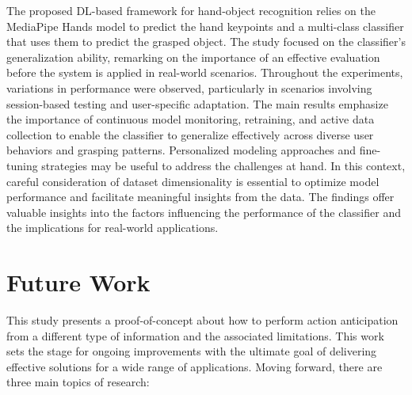 The proposed DL-based framework for hand-object recognition relies on the MediaPipe Hands model to predict the hand keypoints and a multi-class classifier that uses them to predict the grasped object. The study focused on the classifier's generalization ability, remarking on the importance of an effective evaluation before the system is applied in real-world scenarios. Throughout the experiments, variations in performance were observed, particularly in scenarios involving session-based testing and user-specific adaptation. The main results emphasize the importance of continuous model monitoring, retraining, and active data collection to enable the classifier to generalize effectively across diverse user behaviors and grasping patterns. Personalized modeling approaches and fine-tuning strategies may be useful to address the challenges at hand. In this context, careful consideration of dataset dimensionality is essential to optimize model performance and facilitate meaningful insights from the data. 
The findings offer valuable insights into the factors influencing the performance of the classifier and the implications for real-world applications.

\section{Future Work}

This study presents a proof-of-concept about how to perform action anticipation from a different type of information and the associated limitations. This work sets the stage for ongoing improvements with the ultimate goal of delivering effective solutions for a wide range of applications. Moving forward, there are three main topics of research:

